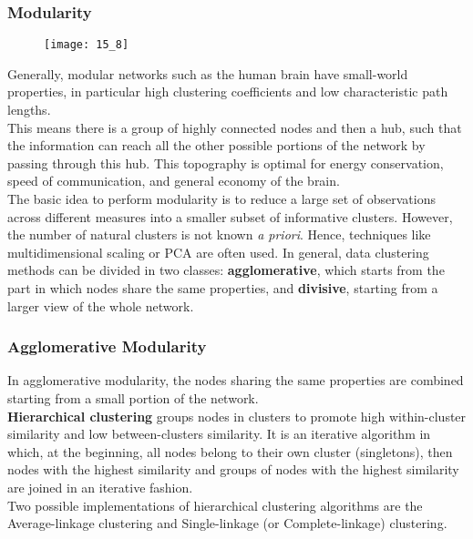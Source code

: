 \subsubsection{Modularity}
\begin{figure}[H]
    \centering
    \texttt{[image: 15\_8]}
\end{figure}
Generally, modular networks such as the human brain have small-world properties, in particular high clustering coefficients
and low characteristic path lengths.\\
This means there is a group of highly connected nodes and then a hub, such that the information can reach all the other
possible portions of the network by passing through this hub. This topography is optimal for energy conservation, speed
of communication, and general economy of the brain.\\
The basic idea to perform modularity is to reduce a large set of observations across different measures into a smaller
subset of informative clusters. However, the number of natural clusters is not known \textit{a priori}. Hence, techniques
like multidimensional scaling or PCA are often used. In general, data clustering methods can be divided in two classes:
\textbf{agglomerative}, which starts from the part in which nodes share the same properties, and \textbf{divisive},
starting from a larger view of the whole network.
\subsubsection{Agglomerative Modularity}
In agglomerative modularity, the nodes sharing the same properties are combined starting from a small portion
of the network.\\
\textbf{Hierarchical clustering} groups nodes in clusters to promote high within-cluster similarity and low
between-clusters similarity. It is an iterative algorithm in which, at the beginning, all nodes belong to their own cluster
(singletons), then nodes with the highest similarity and groups of nodes with the highest similarity are joined in an iterative
fashion.\\
Two possible implementations of hierarchical clustering algorithms are the Average-linkage clustering and Single-linkage
(or Complete-linkage) clustering.
